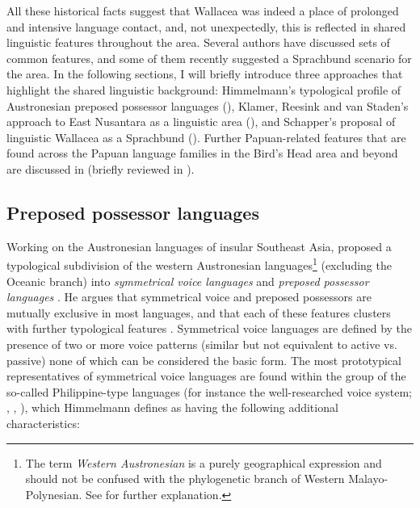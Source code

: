 All these historical facts suggest that Wallacea was indeed a place of prolonged and intensive language contact, and, not unexpectedly, this is reflected in shared linguistic features throughout the area. Several authors have discussed sets of common features, and some of them recently suggested a Sprachbund scenario for the area. In the following sections, I will briefly introduce three approaches that highlight the shared linguistic background: Himmelmann's typological profile of Austronesian preposed possessor languages (), Klamer, Reesink and van Staden's approach to East Nusantara as a linguistic area (), and Schapper's proposal of linguistic Wallacea as a Sprachbund (). Further Papuan-related features that are found across the Papuan language families in the Bird's Head area and beyond are discussed in \citet{reesink2005west} (briefly reviewed in ).

\subsection{Preposed possessor languages}\label{sec:preposed}

Working on the Austronesian languages of insular Southeast Asia, \citeauthor{Himmelmann2005austronesian} proposed a typological subdivision of the western Austronesian languages\footnote{The 
    term \textit{Western Austronesian} is a purely geographical expression and should not be confused with the phylogenetic branch of Western Malayo-Polynesian. See \citet{Himmelmann2005austronesian} 
    for further explanation.
}
(excluding the Oceanic branch) into \emph{symmetrical voice languages} and \emph{preposed possessor languages} \citep{Himmelmann2005austronesian}. He argues that symmetrical voice and preposed possessors are mutually exclusive in most languages, and that each of these features clusters with further typological features \citep[113]{Himmelmann2005austronesian}. Symmetrical voice languages are defined by the presence of two or more voice patterns (similar but not equivalent to active vs. passive) none of which can be considered the basic form. The most prototypical representatives of symmetrical voice languages are found within the group of the so-called Philippine-type languages (for instance the well-researched  voice system; \citealt{schachter1976subject}, \citealt{Himmelmann2005tagalog}, \citealt{riesberg2014symmetrical}), which Himmelmann defines as having the following additional characteristics:


